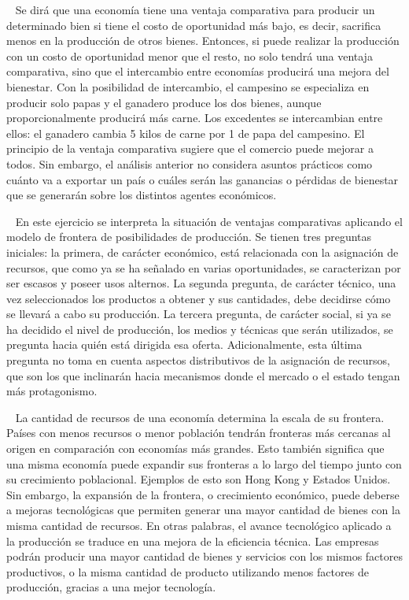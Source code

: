 \documentclass[
  letterpaper,
  DIV=11,
  numbers=noendperiod]{scrreport}
\begin{document}
~ Se dirá que una economía tiene una ventaja comparativa para producir
un determinado bien si tiene el costo de oportunidad más bajo, es decir,
sacrifica menos en la producción de otros bienes. Entonces, si puede
realizar la producción con un costo de oportunidad menor que el resto,
no solo tendrá una ventaja comparativa, sino que el intercambio entre
economías producirá una mejora del bienestar. Con la posibilidad de
intercambio, el campesino se especializa en producir solo papas y el
ganadero produce los dos bienes, aunque proporcionalmente producirá más
carne. Los excedentes se intercambian entre ellos: el ganadero cambia 5
kilos de carne por 1 de papa del campesino. El principio de la ventaja
comparativa sugiere que el comercio puede mejorar a todos. Sin embargo,
el análisis anterior no considera asuntos prácticos como cuánto va a
exportar un país o cuáles serán las ganancias o pérdidas de bienestar
que se generarán sobre los distintos agentes económicos.

~ En este ejercicio se interpreta la situación de ventajas comparativas
aplicando el modelo de frontera de posibilidades de producción. Se
tienen tres preguntas iniciales: la primera, de carácter económico, está
relacionada con la asignación de recursos, que como ya se ha señalado en
varias oportunidades, se caracterizan por ser escasos y poseer usos
alternos. La segunda pregunta, de carácter técnico, una vez
seleccionados los productos a obtener y sus cantidades, debe decidirse
cómo se llevará a cabo su producción. La tercera pregunta, de carácter
social, si ya se ha decidido el nivel de producción, los medios y
técnicas que serán utilizados, se pregunta hacia quién está dirigida esa
oferta. Adicionalmente, esta última pregunta no toma en cuenta aspectos
distributivos de la asignación de recursos, que son los que inclinarán
hacia mecanismos donde el mercado o el estado tengan más protagonismo.

~ La cantidad de recursos de una economía determina la escala de su
frontera. Países con menos recursos o menor población tendrán fronteras
más cercanas al origen en comparación con economías más grandes. Esto
también significa que una misma economía puede expandir sus fronteras a
lo largo del tiempo junto con su crecimiento poblacional. Ejemplos de
esto son Hong Kong y Estados Unidos. Sin embargo, la expansión de la
frontera, o crecimiento económico, puede deberse a mejoras tecnológicas
que permiten generar una mayor cantidad de bienes con la misma cantidad
de recursos. En otras palabras, el avance tecnológico aplicado a la
producción se traduce en una mejora de la eficiencia técnica. Las
empresas podrán producir una mayor cantidad de bienes y servicios con
los mismos factores productivos, o la misma cantidad de producto
utilizando menos factores de producción, gracias a una mejor tecnología.
\end{document}
